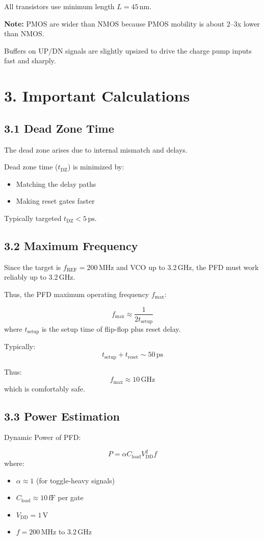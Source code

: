 \begin{itemize}
All transistors use minimum length $L=45\,\text{nm}$.

\textbf{Note:} PMOS are wider than NMOS because PMOS mobility is about 2–3x lower than NMOS.

Buffers on UP/DN signals are slightly upsized to drive the charge pump inputs fast and sharply.

\section*{3. Important Calculations}

\subsection*{3.1 Dead Zone Time}

The dead zone arises due to internal mismatch and delays.

Dead zone time ($t_{\text{DZ}}$) is minimized by:
\begin{itemize}
    \item Matching the delay paths
    \item Making reset gates faster
\end{itemize}

Typically targeted $t_{\text{DZ}} < 5\,\text{ps}$.

\subsection*{3.2 Maximum Frequency}

Since the target is $f_{\text{REF}} = 200\,\text{MHz}$ and VCO up to 3.2\,GHz, the PFD must work reliably up to 3.2\,GHz.

Thus, the PFD maximum operating frequency $f_{\text{max}}$:

\[
f_{\text{max}} \approx \frac{1}{2t_{\text{setup}}}
\]
where $t_{\text{setup}}$ is the setup time of flip-flop plus reset delay.

Typically:
\[
t_{\text{setup}} + t_{\text{reset}} \sim 50\,\text{ps}
\]

Thus:
\[
f_{\text{max}} \approx 10\,\text{GHz}
\]
which is comfortably safe.

\subsection*{3.3 Power Estimation}

Dynamic Power of PFD:

\[
P = \alpha C_{\text{load}} V_{\text{DD}}^2 f
\]
where:
\begin{itemize}
    \item $\alpha \approx 1$ (for toggle-heavy signals)
    \item $C_{\text{load}} \approx 10\,\text{fF}$ per gate
    \item $V_{\text{DD}} = 1\,\text{V}$
    \item $f = 200\,\text{MHz}$ to $3.2\,\text{GHz}$
\end{itemize}


\end{itemize}
